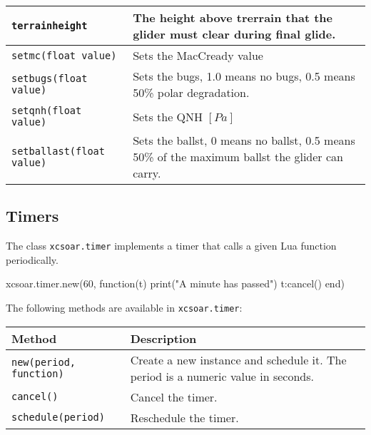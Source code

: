 \begin{maxipage}
\begin{tabularx}{1.9\textwidth}{l|X}
\hline

\verb|terrainheight| & The height above trerrain that the glider must clear during
final glide.\\

\hline

\verb|setmc(float value)| &  Sets the MacCready value\\

\hline

\verb|setbugs(float value)| & Sets the bugs, 1.0 means no bugs, 0.5 means 50\% polar
degradation.\\

\hline

\verb|setqnh(float value)| & Sets the QNH $[{Pa}]$\\

\hline

\verb|setballast(float value)| & Sets the ballst, 0 means no ballst, 0.5 means 50\%
of the maximum \newline ballst the glider can carry.\\

\hline

\end{tabularx}
\end{maxipage}

\subsection{Timers}

The class \verb|xcsoar.timer| implements a timer that calls a given
Lua function periodically.

\begin{lua}
xcsoar.timer.new(60, function(t)
  print("A minute has passed")
  t:cancel()
end)
\end{lua}

The following methods are available in \verb|xcsoar.timer|:

\begin{maxipage}
\begin{tabularx}{1.9\textwidth}{l|X}
Method & Description \\
\hline\hline

\verb|new(period, function)| & Create a new instance and schedule
it.  The period is a numeric value in seconds. \\

\hline

\verb|cancel()| & Cancel the timer. \\

\hline

\verb|schedule(period)| & Reschedule the timer. \\

\end{tabularx}
\end{maxipage}

